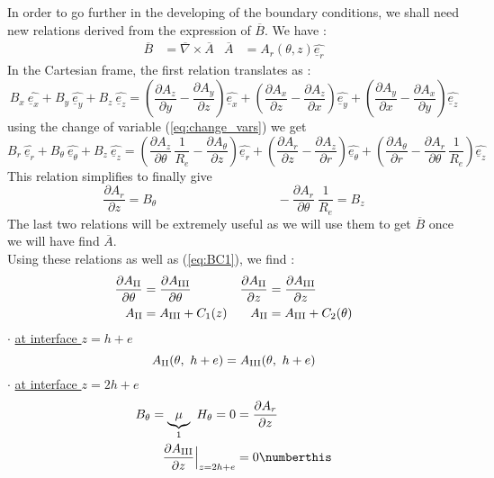 In order to go further in the developing of the boundary conditions, we shall need new relations derived from the expression of $\overline{B}$. We have :
\begin{align*}
    \overline{B} &= \overline{\nabla} \times \overline{A} &
    \overline{A} &= A_r (\theta, z) \widehat{\underline{e}_r}
\end{align*}
In the Cartesian frame, the first relation translates as :
$$
B_x\ \widehat{\underline{e}_x} + B_y\ \widehat{\underline{e}_y} + B_z\ \widehat{\underline{e}_z} = \left( \dfrac{\partial A_z}{\partial y} - \dfrac{\partial A_y}{\partial z} \right) \widehat{\underline{e}_x} +  \left( \dfrac{\partial A_x}{\partial z} - \dfrac{\partial A_z}{\partial x} \right) \widehat{\underline{e}_y} + \left( \dfrac{\partial A_y}{\partial x} - \dfrac{\partial A_x}{\partial y} \right) \widehat{\underline{e}_z}$$
using the change of variable (\ref{eq:change_vars}) we get
$$B_r\ \widehat{\underline{e}_r} + B_{\theta}\ \widehat{\underline{e}_{\theta}} + B_z\ \widehat{\underline{e}_z} = \left( \dfrac{\partial A_z}{\partial \theta}\, \dfrac{1}{R_e} - \dfrac{\partial A_{\theta}}{\partial z} \right) \widehat{\underline{e}_r} +  \left( \dfrac{\partial A_r}{\partial z} - \dfrac{\partial A_z}{\partial r} \right) \widehat{\underline{e}_{\theta}} + \left( \dfrac{\partial A_{\theta}}{\partial r} - \dfrac{\partial A_r}{\partial \theta}\, \dfrac{1}{R_e} \right) \widehat{\underline{e}_z}$$
This relation simplifies to finally give
 $$\dfrac{\partial A_r}{\partial z} = B_{\theta} \hspace{4cm}  - \dfrac{\partial A_r}{\partial \theta}\ \dfrac{1}{R_e} = B_z$$
The last two relations will be extremely useful as we will use them to get $\overline{B}$ once we will have find $\overline{A}$.\\
Using these relations as well as (\ref{eq:BC1}), we find :
\begin{align}
\label{eq:linkAB}
\dfrac{\partial A_{\rm II}}{\partial \theta} &= 
\dfrac{\partial A_{\rm III}}{\partial \theta} &
\dfrac{\partial A_{\rm II}}{\partial z} &= 
\dfrac{\partial A_{\rm III}}{\partial z} \\
A_{\rm II} &= A_{\rm III} + C_1(z) &
A_{\rm II} &= A_{\rm III} + C_2(\theta)
\end{align}
$\cdot$ \underline{at interface $z = h+e$}
\begin{equation}
\label{eq:BC2_1}
A_{\rm II}(\theta,\ h+e) = A_{\rm III}(\theta,\ h+e)    
\end{equation}
$\cdot$ \underline{at interface $z = 2h+e$}
\begin{align*}
    B_{\theta} = \underbrace{\mu}_1\ H_{\theta} = 0 &= \dfrac{\partial A_r}{\partial z} \\
    \dfrac{\partial A_{\rm III}}{\partial z}\Bigr\rvert_{z = 2h+e} &= 0 \numberthis \label{eq:BC2_2}
\end{align*}

